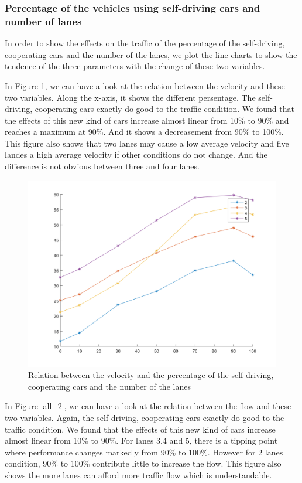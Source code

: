 \documentclass[a4paper]{article}
\begin{document}
	\subsubsection{Percentage of the vehicles using self-driving cars and number of lanes}%
	In order to show the effects on the traffic of the percentage of the self-driving, cooperating cars and the number of the lanes, we plot the line charts to show the tendence of the three parameters with the change of these two variables.

	In Figure \ref{all_1}, we can have a look at the relation between the velocity and these two variables. Along the x-axis, it shows the different persentage. The self-driving, cooperating cars exactly do good to the traffic condition. We found that the effects of this new kind of cars increase almost linear from 10\% to 90\% and reaches a maximum at 90\%. And it shows a decreasement from 90\% to 100\%. This figure also shows that two lanes may cause a low average velocity and five landes a high average velocity if other conditions do not change. And the difference is not obvious between three and four lanes.

	\begin{figure}[H]
		\centering
		\includegraphics[scale=0.5]{../imgs/all_1}
		\caption{Relation between the velocity and the percentage of the self-driving, cooperating cars and the number of the lanes}
		\label{all_1}
	\end{figure}

	In Figure \ref{all_2}, we can have a look at the relation between the flow and these two variables. Again, the self-driving, cooperating cars exactly do good to the traffic condition.  We found that the effects of this new kind of cars increase almost linear from 10\% to 90\%. For lanes 3,4 and 5, there is a tipping point where performance changes markedly from 90\% to 100\%. However for 2 lanes condition, 90\% to 100\% contribute little to increase the flow. This figure also shows the more lanes can afford more traffic flow which is understandable.
\end{document}
